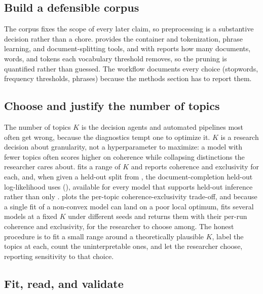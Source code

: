\documentclass[article,nojss]{jss}
\begin{document}
\subsection{Build a defensible corpus}

The corpus fixes the scope of every later claim, so preprocessing is a
substantive decision rather than a chore.  provides the 
container and tokenization, phrase learning, and document-splitting tools, and
 with  reports how many
documents, words, and tokens each vocabulary threshold removes, so the pruning is
quantified rather than guessed. The workflow documents every choice (stopwords,
frequency thresholds, phrases) because the methods section has to report them.

\subsection{Choose and justify the number of topics}

The number of topics $K$ is the decision agents and automated pipelines most
often get wrong, because the diagnostics tempt one to optimize it. $K$ is a
research decision about granularity, not a hyperparameter to maximize: a model
with fewer topics often scores higher on coherence while collapsing distinctions
the researcher cares about.  fits a range of $K$ and
reports coherence and exclusivity for each, and, when given a held-out split from
, the document-completion held-out log-likelihood
 uses (), available for every model that
supports held-out inference rather than only .
 plots the per-topic coherence-exclusivity
trade-off, and because a single fit of a non-convex model can land on a poor
local optimum,  fits several models at a fixed $K$
under different seeds and returns them with their per-run coherence and
exclusivity, for the researcher to choose among. The honest procedure is to
fit a small range around a theoretically plausible $K$, label the topics at each,
count the uninterpretable ones, and let the researcher choose, reporting
sensitivity to that choice.

\subsection{Fit, read, and validate}
\end{document}
